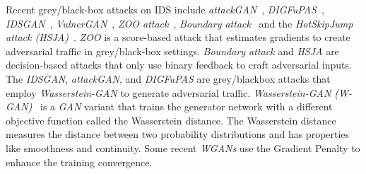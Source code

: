 Recent grey/black-box attacks on IDS include \textit{attackGAN}~\cite{zhao2021attackgan}, \textit{DIGFuPAS}~\cite{duy2021digfupas},
\textit{IDSGAN}~\cite{lin2022idsgan}, \textit{VulnerGAN}~\cite{liu2022vulnergan}, \textit{ZOO attack}~\cite{chen2017zoo},
\textit{Boundary attack}~\cite{chen2019boundary} and the \textit{HotSkipJump attack (HSJA)}~\cite{chen2020hopskipjumpattack}.
\textit{ZOO} is a score-based attack that estimates gradients to create adversarial traffic in grey/black-box settings.
\textit{Boundary attack} and \textit{HSJA} are decision-based attacks that only use binary feedback to craft adversarial inputs.
The \textit{IDSGAN}, \textit{attackGAN}, and \textit{DIGFuPAS} are grey/blackbox attacks that employ \textit{Wasserstein-GAN} to generate adversarial traffic.
\textit{Wasserstein-GAN (W-GAN)}~\cite{gulrajani2017improved} is a \textit{GAN} variant that trains the generator network with a different
objective function called the Wasserstein distance.
The Wasserstein distance measures the distance between two probability distributions and has properties like
smoothness and continuity.
Some recent \textit{WGANs} use the Gradient Penalty to enhance the training convergence.